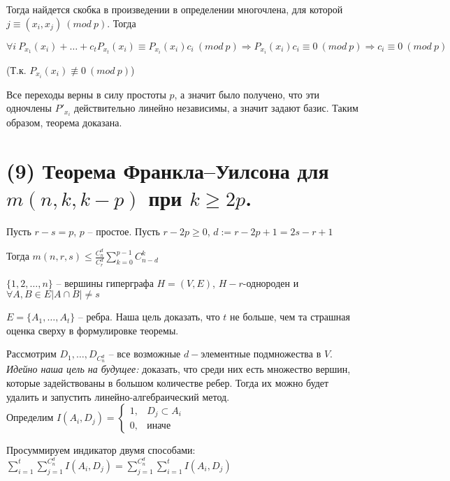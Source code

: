 Тогда найдется скобка в произведении в определении многочлена, для которой $j \equiv (x_i, x_j) \ (mod \ p)$. Тогда

$$\forall i \ P_{x_1}(x_i) + \ldots + c_t P_{x_t}(x_i) \equiv P_{x_i}(x_i)c_i \ (mod \ p) \Longrightarrow P_{x_i}(x_i)c_i \equiv 0 \ (mod \ p) \Longrightarrow c_i \equiv 0 \ (mod \ p)$$ 

(Т.к. $P_{x_i}(x_i) \not\equiv 0 \ (mod \ p)$)

Все переходы верны в силу простоты $p$, а значит было получено, что эти одночлены $P'_{x_i}$ действительно линейно независимы, а значит задают базис. Таким образом, теорема доказана.

\EndProof

\newpage{}

\section{(9) Теорема Франкла–Уилсона для $m(n, k, k - p)$ при $k \geqslant 2p$.}

\Th Пусть $r - s = p$, $p$ -- простое. Пусть $r - 2p \geq 0$, $d := r - 2p + 1 = 2s - r + 1$

Тогда $m(n, r, s) \le \frac{C_n^d}{C_r^d} \sum\limits_{k=0}^{p-1}C_{n-d}^k$

\Proof

$\{1, 2, \ldots, n\}$ -- вершины гиперграфа $H = (V, E)$, $H - r$-однороден и $\forall A, B \in E |A \cap B| \neq s$

$E = \{A_1, \ldots, A_t\}$ -- ребра. Наша цель доказать, что $t$ не больше, чем та страшная оценка сверху в формулировке теоремы.

Рассмотрим $D_1, \ldots, D_{C_n^d}$ -- все возможные $d-$элементные подмножества в $V$.\\

\textit{Идейно наша цель на будущее:} доказать, что среди них есть множество вершин, которые задействованы в большом количестве ребер. Тогда их можно будет удалить и запустить линейно-алгебраический метод.\\

Определим $I(A_i, D_j) = 
 \begin{cases}
   1, & D_j \subset A_i\\
   0, &\text{иначе}
 \end{cases}$
 
Просуммируем индикатор двумя способами:
$\sum\limits_{i=1}^t \sum\limits_{j=1}^{C_n^d} I(A_i, D_j) = 
\sum\limits_{j=1}^{C_n^d} \sum\limits_{i=1}^t I(A_i, D_j)$

